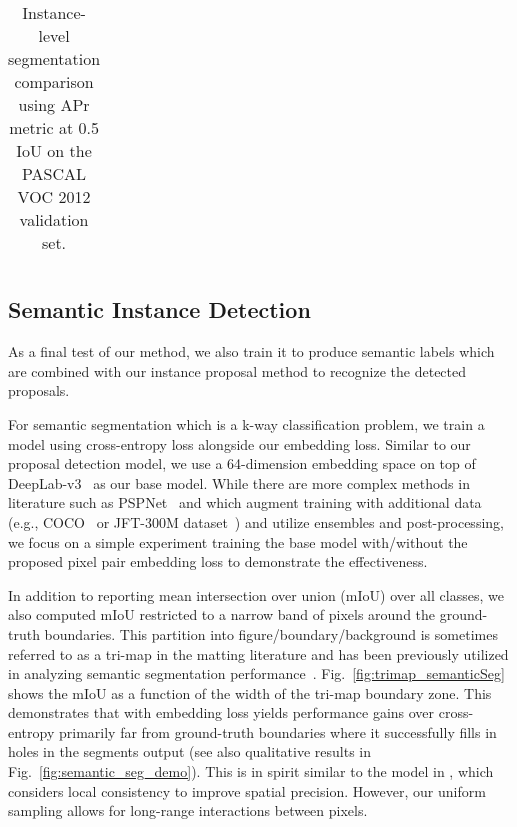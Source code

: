 \documentclass[10pt,twocolumn,letterpaper]{article}
\begin{document}
{\begin{table*}[!htbp]
\begin{center}
\begin{tabular}{| c | c c c c c c c c c c c c c c c c c c c c | c |}
\end{tabular}
\vspace{-5mm}
\end{center}
  \caption{Instance-level segmentation comparison using APr metric at 0.5 IoU on the PASCAL VOC 2012 validation set.}
\vspace{-2mm}
\label{tab:results_iou}
\end{table*}
}\subsection{Semantic Instance Detection}As a final test of our method, we also train it to produce semantic labels
which are combined with our instance proposal method to recognize the detected
proposals.

For semantic segmentation which is a k-way classification problem, we train a
model using cross-entropy loss alongside our embedding loss.  Similar to our
proposal detection model, we use a 64-dimension embedding space on top of
DeepLab-v3~\cite{chen2017rethinking} as our base model.  While there are more
complex methods in literature such as PSPNet~\cite{zhao2016pyramid} and which
augment training with additional data (e.g., COCO~\cite{lin2014microsoft} or
JFT-300M dataset~\cite{sun2017revisiting}) and utilize ensembles and
post-processing, we focus on a simple experiment training the base model
with/without the proposed pixel pair embedding loss to demonstrate the
effectiveness. 

In addition to reporting mean intersection over union (mIoU) over all
classes,
we also computed mIoU restricted to a narrow band of pixels around the
ground-truth boundaries.  This partition into figure/boundary/background is
sometimes referred to as a tri-map in the matting literature and has been
previously utilized in analyzing semantic segmentation
performance~\cite{kohli2009robust, chen2016deeplab, ghiasi2016laplacian}.
Fig.~\ref{fig:trimap_semanticSeg} shows the mIoU as a function of the width
of the tri-map boundary zone.  This demonstrates that with embedding loss
yields performance gains over cross-entropy primarily far from ground-truth
boundaries where it successfully fills in holes in the segments output
(see also qualitative results in Fig.~\ref{fig:semantic_seg_demo}).
This is in spirit similar to the model in \cite{harley2017segmentation},
which considers local consistency to improve spatial precision.
However, our uniform sampling allows for long-range interactions between pixels.
\end{document}
